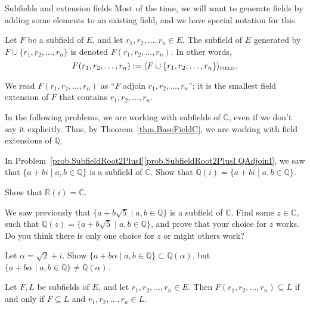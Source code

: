 \begin{section}{Subfields and extension fields}
Most of the time, we will want to generate fields by adding some elements to an existing field, and we have special notation for this.

\begin{notation}
Let $F$ be a subfield of $E$, and let $r_1,r_2,\ldots,r_n \in E$. The subfield of $E$ generated by $F\cup \{r_1,r_2,\ldots,r_n\}$ is denoted $F(r_1,r_2,\ldots,r_n)$. In other words, \[F(r_1,r_2,\ldots,r_n) := \langle F\cup \{r_1,r_2,\ldots,r_n\} \rangle_{\textsc{field}}.\]
\end{notation}

We read $F(r_1,r_2,\ldots,r_n)$  as ``$F$ adjoin $r_1,r_2,\ldots,r_n$''; it is the smallest field extension of $F$ that contains $r_1,r_2,\ldots,r_n$.

In the following problems, we are working with subfields of $\mathbb{C}$, even if we don't say it explicitly. Thus, by Theorem~\ref{thm.BaseFieldC}, we are working with field extensions of $\mathbb{Q}.$

\begin{problem}\label{prob.QAdjoinI}
In Problem~\ref{prob.SubfieldRoot2PlusI}\ref{prob.SubfieldRoot2PlusI.QAdjoinI}, we saw that $\{a+bi\mid a,b\in \mathbb{Q}\}$ is a subfield of $\mathbb{C}$. 
Show that $\mathbb{Q}(i) = \{a+bi\mid a,b\in \mathbb{Q}\}$. 
\end{problem}

\begin{problem}
Show that $\mathbb{R}(i) =\mathbb{C}$. 
\end{problem}

\begin{problem}
We saw previously that $\{a+b\sqrt{5}\mid a,b\in \mathbb{Q}\}$ is a subfield of $\mathbb{C}$. Find some $z\in \mathbb{C}$, such that $\mathbb{Q}(z) = \{a+b\sqrt{5}\mid a,b\in \mathbb{Q}\}$, and prove that your choice for $z$ works. Do you think there is only one choice for $z$ or might others work?
\end{problem}

\begin{problem}\label{prob.QAdjoinRoot2PlusI}
Let $\alpha = \sqrt{2} + i$. Show  $\{a+b\alpha\mid a,b\in \mathbb{Q}\} \subset \mathbb{Q}(\alpha)$, but $\{a+b\alpha\mid a,b\in \mathbb{Q}\} \neq \mathbb{Q}(\alpha)$. 
\end{problem}


\begin{theorem}
Let $F,L$ be subfields of $E$, and let $r_1,r_2,\ldots,r_n \in E$. Then $F(r_1,r_2,\ldots,r_n) \subseteq L$ if and only if $F\subseteq L$ and $r_1,r_2,\ldots,r_n\in L$.
\end{theorem}


\end{section}
